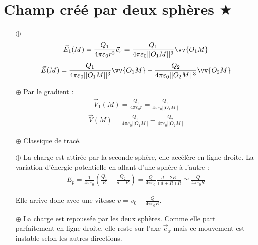 \documentclass{report}
\begin{document}
\section*{Champ créé par deux sphères $\bigstar$}

\begin{itemize}

	\item[$\oplus$] 
	\begin{align*}
		\vec{E}_1(M)=\frac{Q_1}{4\pi\varepsilon_0r^2}\vec{e}_r=\frac{Q_1}{4\pi\varepsilon_0||O_1M||^3}\vv{O_1M}
	\end{align*}
		\begin{align*}
		\vec{E}(M)=\frac{Q_1}{4\pi\varepsilon_0||O_1M||^3}\vv{O_1M}-\frac{Q_2}{4\pi\varepsilon_0||O_2M||^3}\vv{O_2M}
	\end{align*}
	
	\item[$\oplus$] Par le gradient :
		\begin{align*}
		\vec{V}_1(M)=\frac{Q_1}{4\pi\varepsilon_0r}=\frac{Q_1}{4\pi\varepsilon_0||O_1M||}
	    \end{align*}
	    \begin{align*}
		\vec{V}(M)=\frac{Q_1}{4\pi\varepsilon_0||O_1M||}-\frac{Q_2}{4\pi\varepsilon_0||O_2M||}
	    \end{align*}
	
	
	\item[$\oplus$] Classique de tracé.
	
	\item[$\oplus$] La charge est attirée par la seconde sphère, elle accélère en ligne droite. La variation d'énergie potentielle en allant d'une sphère à l'autre :
	\begin{align*}
		E_p=\frac{1}{4\pi\varepsilon_0}\left(\frac{Q_1}{R}-\frac{Q_2}{d-R} \right) =\frac{Q}{4\pi\varepsilon_0}\frac{d-2R}{(d+R)R}\simeq\frac{Q}{4\pi\varepsilon_0R}
	\end{align*}
	
	Elle arrive donc avec une vitesse $v=v_0+\frac{Q}{4\pi\varepsilon_0R}$.
	
	\item[$\oplus$] La charge est repoussée par les deux sphères. Comme elle part parfaitement en ligne droite, elle reste sur l'axe $\vec{e}_x$ mais ce mouvement est instable selon les autres directions. 

\end{itemize}
\end{document}

